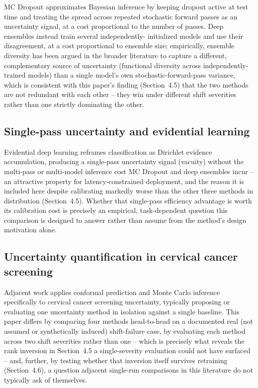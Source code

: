 \documentclass[runningheads]{llncs}
\begin{document}
MC Dropout \cite{gal2016dropout} approximates Bayesian inference by
keeping dropout active at test time and treating the spread across
repeated stochastic forward passes as an uncertainty signal, at a cost
proportional to the number of passes. Deep ensembles
\cite{lakshminarayanan2017ensembles} instead train several independently-
initialized models and use their disagreement, at a cost proportional to
ensemble size; empirically, ensemble diversity has been argued in the
broader literature to capture a different, complementary source of
uncertainty (functional diversity across independently-trained models)
than a single model's own stochastic-forward-pass variance, which is
consistent with this paper's finding (Section~4.5) that the two methods
are not redundant with each other -- they win under different shift
severities rather than one strictly dominating the other.

\subsection{Single-pass uncertainty and evidential learning}

Evidential deep learning \cite{sensoy2018evidential} reframes
classification as Dirichlet evidence accumulation, producing a
single-pass uncertainty signal (vacuity) without the multi-pass or
multi-model inference cost MC Dropout and deep ensembles incur -- an
attractive property for latency-constrained deployment, and the reason it
is included here despite calibrating markedly worse than the other three
methods in distribution (Section~4.5). Whether that single-pass efficiency
advantage is worth its calibration cost is precisely an empirical,
task-dependent question this comparison is designed to answer rather than
assume from the method's design motivation alone.

\subsection{Uncertainty quantification in cervical cancer screening}

Adjacent work applies conformal prediction and Monte Carlo inference
specifically to cervical cancer screening uncertainty, typically
proposing or evaluating one uncertainty method in isolation against a
single baseline. This paper differs by comparing four methods head-to-head
on a documented real (not assumed or synthetically induced) shift-failure
case, by evaluating each method across two shift severities rather than
one -- which is precisely what reveals the rank inversion in Section~4.5
a single-severity evaluation could not have surfaced -- and, further, by
testing whether that inversion itself survives retraining
(Section~4.6), a question adjacent single-run comparisons in this
literature do not typically ask of themselves.
\end{document}
